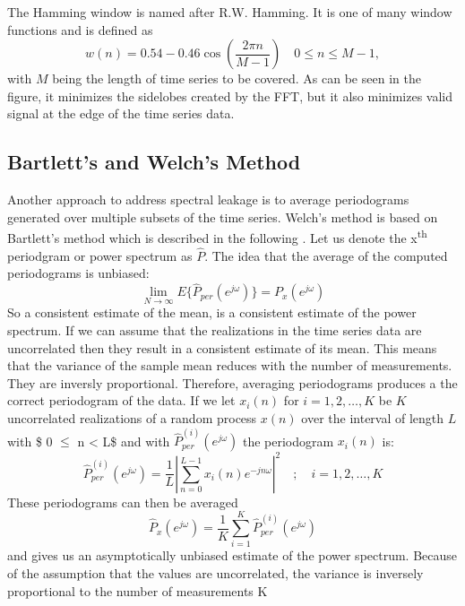 \documentclass[phd,black, hidelinks]{PrincetonThesis}
\newcommand{\euler}{e}
\begin{document}
The Hamming window is named after R.W. Hamming. It is one of many window functions and is defined as
\begin{equation}
w(n) = 0.54 - 0.46 \cos \left( \frac{2\pi n}{M - 1}  \right) \quad
0 \leq n \leq M - 1,
\end{equation}
with \(M\) being the length of time series to be covered. As can be seen in the figure, it minimizes the sidelobes created by the FFT, but it also minimizes valid signal at the edge of the time series data.

\subsection{Bartlett's and Welch's Method}
\label{sec:org8c2ba65}
Another approach to address spectral leakage is to average periodograms generated over multiple subsets of the time series. Welch's method is based on Bartlett's method which is described in the following \cite{bartlett1948}. Let us denote the x\textsuperscript{th} periodgram or power spectrum as \(\hat{P}\).
The idea that the average of the computed periodograms is unbiased:
\begin{equation}
\lim_{N \to \infty} E\{\hat{P}_{per}(\euler^{j\omega})\} = P_x(\euler^{j\omega})
\end{equation}
So a consistent estimate of the mean, is a consistent estimate of the power spectrum. If we can assume that the realizations in the time series data are uncorrelated then they result in a consistent estimate of its mean. This means that the variance of the sample mean reduces with the number of measurements. They are inversly proportional. Therefore, averaging periodograms produces a the correct periodogram of the data. If we let \(x_i(n)\) for \(i = 1,2, \dots, K\) be \(K\) uncorrelated realizations of a random process \(x(n)\) over the interval of length \(L\) with \$ 0 \(\le\) n < L\$ and with \(\hat{P}_{per}^{(i)}(\euler^{j\omega})\) the periodogram \(x_i(n)\) is:
\begin{equation}
\hat{P}_{per}^{(i)}(\euler^{j\omega})= \frac{1}{L} \left\lvert \sum_{n=0}^{L-1} x_i(n)\euler^{-jn\omega}  \right\lvert^2 \quad ; \quad
i= 1,2, \dots, K
\end{equation}
These periodograms can then be averaged
\begin{equation}
\hat{P}_x (\euler^{j\omega}) = \frac{1}{K} \sum_{i=1}^K \hat{P}_{per}^{(i)}(\euler^{j\omega})
\end{equation}
and gives us an asymptotically unbiased estimate of the power spectrum. Because of the assumption that the values are uncorrelated, the variance is inversely proportional to the number of measurements K
\end{document}
